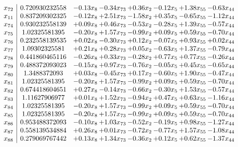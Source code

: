 \documentclass[8pt]{article}
\begin{document}
\[\begin{array}{c| c c@{\hskip 2pt} c@{\hskip 2pt} c@{\hskip 2pt} c@{\hskip 2pt} c@{\hskip 2pt} c@{\hskip 2pt} }
 x_{72}   &  0.720930232558 & -0.13 x_{8} & -0.34 x_{73} & +  0.36 x_{2} & -0.12 x_{5} & +  1.38 x_{55} & -0.63 x_{44}\\
 x_{11}   &  0.837209302325 & -0.12 x_{8} & +  2.51 x_{73} & -1.58 x_{2} & +  0.35 x_{5} & -0.65 x_{55} & -1.12 x_{44}\\
 x_{74}   &  0.930232558139 & +  0.09 x_{8} & +  0.46 x_{73} & -0.53 x_{2} & -0.28 x_{5} & +  1.39 x_{55} & -0.57 x_{44}\\
 x_{75}   &  1.02325581395 & -0.20 x_{8} & +  1.57 x_{73} & -0.99 x_{2} & +  0.09 x_{5} & +  0.59 x_{55} & -0.70 x_{44}\\
 x_{76}   &  0.232558139535 & +  0.02 x_{8} & -0.30 x_{73} & +  0.12 x_{2} & -0.07 x_{5} & +  0.93 x_{55} & +  0.02 x_{44}\\
 x_{77}   &  1.09302325581 & +  0.21 x_{8} & +  0.28 x_{73} & +  0.05 x_{2} & -0.63 x_{5} & +  1.37 x_{55} & -0.79 x_{44}\\
 x_{78}   &  0.441860465116 & -0.26 x_{8} & +  0.33 x_{73} & -0.28 x_{2} & +  0.77 x_{5} & +  0.77 x_{55} & -0.26 x_{44}\\
 x_{79}   &  0.488372093023 & -0.15 x_{8} & +  0.97 x_{73} & -0.76 x_{2} & -0.05 x_{5} & +  0.45 x_{55} & -0.65 x_{44}\\
 x_{80}   &  1.3488372093 & +  0.03 x_{8} & -0.45 x_{73} & +  0.17 x_{2} & -0.60 x_{5} & +  1.90 x_{55} & -0.47 x_{44}\\
 x_{81}   &  1.02325581395 & -0.20 x_{8} & +  1.57 x_{73} & -0.99 x_{2} & +  0.09 x_{5} & +  0.59 x_{55} & -0.70 x_{44}\\
 x_{82}   &  0.674418604651 & +  0.27 x_{8} & -0.14 x_{73} & -0.66 x_{2} & -0.30 x_{5} & +  1.53 x_{55} & -0.57 x_{44}\\
 x_{83}   &  1.11627906977 & +  0.01 x_{8} & +  1.52 x_{73} & -0.94 x_{2} & +  0.47 x_{5} & +  0.63 x_{55} & -1.16 x_{44}\\
 x_{84}   &  1.02325581395 & -0.20 x_{8} & +  1.57 x_{73} & -0.99 x_{2} & +  0.09 x_{5} & +  0.59 x_{55} & -0.70 x_{44}\\
 x_{85}   &  1.02325581395 & -0.20 x_{8} & +  1.57 x_{73} & -0.99 x_{2} & +  0.09 x_{5} & +  0.59 x_{55} & -0.70 x_{44}\\
 x_{86}   &  0.953488372093 & -0.10 x_{8} & +  1.03 x_{73} & -0.52 x_{2} & -0.19 x_{5} & +  0.98 x_{55} & -1.27 x_{44}\\
 x_{87}   &  0.558139534884 & +  0.26 x_{8} & +  0.01 x_{73} & -0.72 x_{2} & -0.77 x_{5} & +  1.57 x_{55} & -1.08 x_{44}\\
 x_{88}   &  0.279069767442 & +  0.13 x_{8} & +  1.34 x_{73} & -0.36 x_{2} & +  0.12 x_{5} & +  0.62 x_{55} & -1.37 x_{44}\\

\end{array}\]
\end{document}
